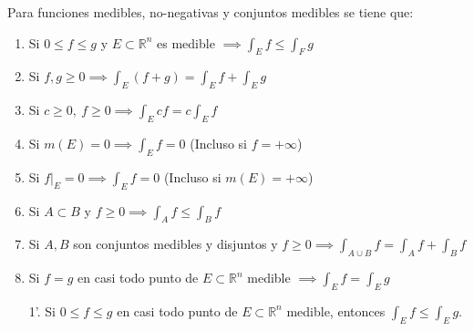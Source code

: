 \begin{proposición}
Para funciones medibles, no-negativas y conjuntos medibles se tiene que:
\vspace{-0.5em}
\begin{enumerate}
    \item Si $0 \leq f \leq g$ y $E \subset \mathbb{R}^n$ es medible $\implies \int_E f
              \leq \int_F g$
    \item Si $f, g \geq 0 \implies \int_E (f + g) = \int_E f + \int_E g$
    \item Si $c \geq 0, \ f \geq 0 \implies \int_E cf = c \int_E f$
    \item Si $m(E) = 0 \implies \int_E f = 0$ (Incluso si $f = +\infty$)
    \item Si $f\big|_E = 0 \implies \int_E f = 0$ (Incluso si $m(E) = +\infty$)
    \item Si $A \subset B$ y $f \geq 0 \implies \int_A f \leq \int_B f$
    \item Si $A, B$ son conjuntos medibles y disjuntos y $f\geq 0 \implies \int_{A \cup
                  B} f = \int_A f + \int_B f$
    \item Si $f = g$ en casi todo punto de $E \subset \mathbb{R}^n$ medible $\implies \int_E f = \int_E g$
    \item [1'.] Si $0 \leq f \leq g$ en casi todo punto de $E \subset \mathbb{R}^n$ medible, entonces $\int_E f \leq \int_E g$. 
\end{enumerate}
\label{prop:PropiedadesIntegralesLebesgue}
\end{proposición}
